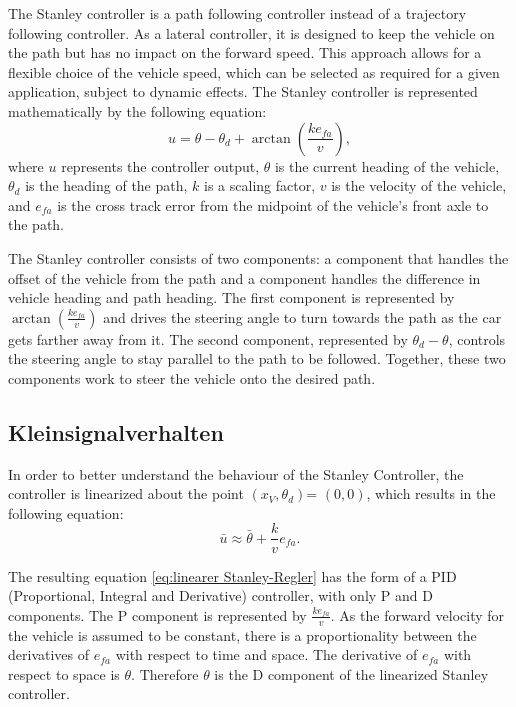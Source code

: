 \documentclass[arbeit=studie,oneside,BCOR=12mm]{ArbeitRST}
\begin{document}
The Stanley controller is a path following controller instead of a trajectory
following controller. As a lateral controller, it is designed to keep the
vehicle on the path but has no impact on the forward speed. This approach
allows for a flexible choice of the vehicle speed, which can be selected as
required for a given application, subject to dynamic effects. The Stanley
controller is represented mathematically by the following equation: 
\begin{equation} 
    u = \theta - \theta_d + \arctan\left(\frac{ke_{fa}}{v}\right), 
    \label{eq:Stanley-Regler} 
\end{equation}
where $u$ represents the controller output, $\theta$ is the current heading of
the vehicle, $\theta_d$ is the heading of the path, $k$ is a scaling factor,
$v$ is the velocity of the vehicle, and $e_{fa}$ is the cross track error from
the midpoint of the vehicle's front axle to the path.

The Stanley controller consists of two components: a component that handles the
offset of the vehicle from the path and a component handles the difference in
vehicle heading and path heading. The first component is represented by
$\arctan(\frac{ke_{fa}}{v})$ and drives the steering angle to turn towards the
path as the car gets farther away from it. The second component, represented by
$\theta_d - \theta$, controls the steering angle to stay parallel to the path
to be followed. Together, these two components work to steer the vehicle onto
the desired path.

\subsection{Kleinsignalverhalten}

In order to better understand the behaviour of the Stanley Controller, the
controller is linearized about the point \(\left(x_V, \theta_d\right)\)=
\(\left(0, 0\right)\), which results in the following equation:
\begin{equation} 
    \bar{u} \approx \bar{\theta} + \frac{k}{v}e_{fa}.
    \label{eq:linearer Stanley-Regler} 
\end{equation}

The resulting equation \eqref{eq:linearer Stanley-Regler} has the form of a PID
(Proportional, Integral and Derivative) controller, with only P and D
components. The P component is represented by \(\frac{ke_{fa}}{v}\). As the
forward velocity for the vehicle is assumed to be constant, there is a
proportionality between the derivatives of \(e_{fa}\) with respect to time and
space. The derivative of \(e_{fa}\) with respect to space is \(\theta\).
Therefore \(\theta\) is the D component of the linearized Stanley controller.
\end{document}
